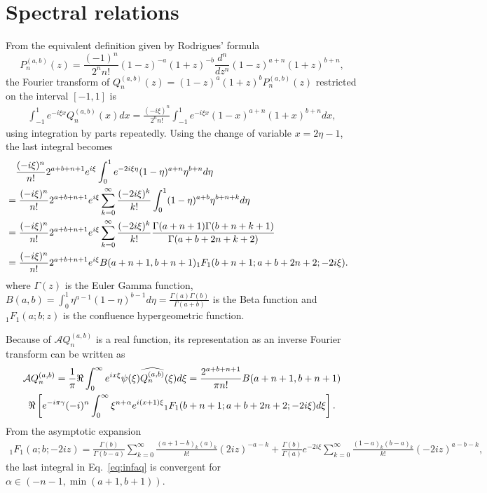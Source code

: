 \section{Spectral relations}

From the equivalent definition given by Rodrigues' formula
\[
  P_{n}^{(a,b)}(z) = \frac{(-1)^n}{2^nn!} (1-z)^{-a}(1+z)^{-b}
  \frac{d^n}{dz^n} (1-z)^{a+n}(1+z)^{b+n},
\]
the Fourier transform of $Q_n^{(a,b)}(z) = (1-z)^a(1+z)^bP_n^{(a,b)}(z)$
restricted on the interval $[-1,1]$ is 
\begin{align*}
  \int_{-1}^1 e^{-i\xi x} Q_n^{(a,b)}(x)dx
  = \frac{(-i\xi)^n}{2^nn!}\int_{-1}^1 e^{-i\xi x} (1-x)^{a+n}(1+x)^{b+n}dx,
\end{align*}
using integration by parts repeatedly. Using the change of variable $x = 2\eta-1$, the last 
integral becomes 
\begin{align*}
  &\quad \frac{(-i\xi)^n}{n!} 2^{a+b+n+1}e^{i\xi}
  \int_0^1 e^{-2i\xi\eta}(1-\eta)^{a+n}\eta^{b+n} d\eta\cr
  &= \frac{(-i\xi)^n}{n!} 2^{a+b+n+1}e^{i\xi}\sum_{k=0}^\infty \frac{(-2i\xi)^k}{k!}
  \int_0^1 (1-\eta)^{a+b}\eta^{b+n+k}d\eta\cr
  &= 
  \frac{(-i\xi)^n}{n!} 2^{a+b+n+1}e^{i\xi}\sum_{k=0}^\infty \frac{(-2i\xi)^k}{k!}
  \frac{\Gamma(a+n+1)\Gamma(b+n+k+1)}{\Gamma(a+b+2n+k+2)} \cr
  &= \frac{(-i\xi)^n}{n!} 2^{a+b+n+1}e^{i\xi}B(a+n+1,b+n+1)
  { }_1F_1(b+n+1;a+b+2n+2;-2i\xi).
\end{align*}
where $\Gamma(z)$ is the Euler Gamma function, $B(a,b)=\int_0^1 \eta^{a-1}(1-\eta)^{b-1}d\eta
=\frac{\Gamma(a)\Gamma(b)}{\Gamma(a+b)}$ is the Beta function
and ${ }_1F_1(a;b;z)$ is the confluence hypergeometric function.

Because of $\mathcal{A}Q_n^{(a,b)}$ is a real function, its representation as 
an inverse Fourier transform can be  written as 
\begin{multline}
  \mathcal{A}Q_n^{(a,b)} = \frac{1}{\pi} \Re \int_0^\infty 
  e^{ix\xi} \psi(\xi) \widehat{Q_n^{(a,b)}}(\xi)d\xi 
  = \frac{2^{a+b+n+1}}{\pi n!}B(a+n+1,b+n+1)\cr
  \Re\left[ e^{-i\pi\gamma} (-i)^n
  \int_0^\infty \xi^{n+\alpha} e^{i(x+1)\xi}
{ }_1F_1(b+n+1;a+b+2n+2;-2i\xi)d\xi\right].
\label{eq:infaq}
\end{multline}
From the asymptotic expansion 
\begin{align*}
    { }_1F_1(a;b;-2iz) 
    =\frac{\Gamma(b)}{\Gamma(b-a)}
    \sum_{k=0}^\infty \frac{(a+1-b)_k(a)_k}{k!}(2iz)^{-a-k}
    +\frac{\Gamma(b)}{\Gamma(a)}
    e^{-2i\xi} \sum_{k=0}^\infty \frac{(1-a)_k(b-a)_k}{k!}(-2iz)^{a-b-k},
  \end{align*}
  the last integral in Eq.~\eqref{eq:infaq} is convergent for 
  $\alpha \in (-n-1, \min(a+1,b+1))$.
\begin{lem}
\end{lem}
